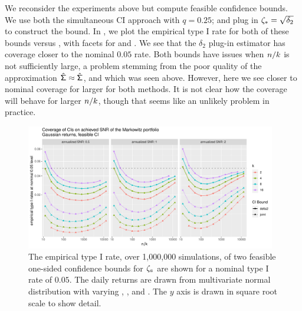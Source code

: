 \documentclass[10pt,a4paper,english]{article}
\theoremstyle{plain}
\theoremstyle{definition}
\theoremstyle{remark}
\begin{document}
We reconsider the experiments above %
but compute feasible confidence bounds.
We use both the simultaneous CI approach with $q=0.25$; 
and plug in $\psnropt=\sqrt{\delta_2}$ to construct the bound.
In , we plot the empirical type I rate for both of these bounds
versus \ssiz, with facets for \psnropt and \nstrat.
We see that the $\delta_2$ plug-in estimator has coverage closer to the nominal $0.05$ rate.
Both bounds have issues when $\ssiz/\nstrat$ is not sufficiently large, a problem stemming
from the poor quality of the approximation $\svsig\approx\svsig$, and which was seen
above.
However, here we see closer to nominal coverage for larger \nstrat for both methods.
It is not clear how the coverage will behave for larger $\ssiz/\nstrat$, though
that seems like an unlikely problem in practice.
%
\begin{knitrout}\small
{}\color{fgcolor}\begin{figure}[h]
\includegraphics[width=0.975\textwidth,height=0.4875\textwidth]{figure/snrinffeasible_ci_plots-1} \caption[The empirical type I rate, over 1,000,000 simulations, of two feasible one-sided confidence bounds for $\psnr_{a}$ are shown for a nominal type I rate of $0.05$]{The empirical type I rate, over 1,000,000 simulations, of two feasible one-sided confidence bounds for $\psnr_{a}$ are shown for a nominal type I rate of $0.05$. The daily returns are drawn from multivariate normal distribution with varying \psnropt, \ssiz, and \nlatf. The $y$ axis is drawn in square root scale to show detail. }\label{fig:feasible_ci_plots}
\end{figure}


\end{knitrout}
\end{document}
